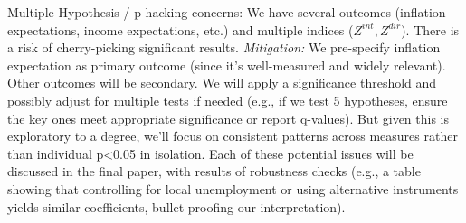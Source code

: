 \documentclass[12pt]{article}
\begin{document}
Multiple Hypothesis / p-hacking concerns: We have several outcomes (inflation expectations, income expectations, etc.) and multiple indices ($Z^{int}, Z^{dir}$). There is a risk of cherry-picking significant results. \textit{Mitigation:} We pre-specify inflation expectation as primary outcome (since it's well-measured and widely relevant). Other outcomes will be secondary. We will apply a significance threshold and possibly adjust for multiple tests if needed (e.g., if we test 5 hypotheses, ensure the key ones meet appropriate significance or report q-values). But given this is exploratory to a degree, we'll focus on consistent patterns across measures rather than individual p<0.05 in isolation.
Each of these potential issues will be discussed in the final paper, with results of robustness checks (e.g., a table showing that controlling for local unemployment or using alternative instruments yields similar coefficients, bullet-proofing our interpretation).
\end{document}
